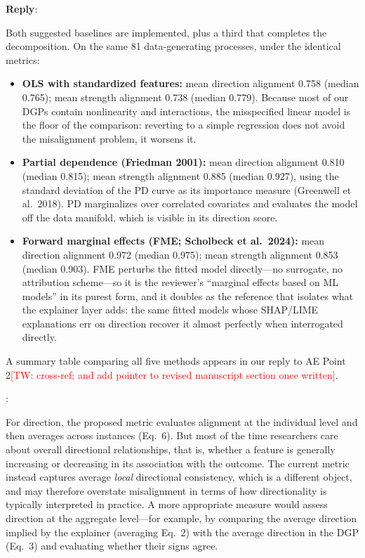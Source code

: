 \documentclass[11pt]{article}
\newcommand{\tw}[1]{\textcolor{red}{[TW: #1]}}
\newcounter{se}[section]
\newcounter{reviewer}
\newcounter{point}[reviewer]
\renewcommand{\thepoint}{R\,\thereviewer.\arabic{point}}
\newenvironment{point}{
    \refstepcounter{point} \bigskip \noindent {\textbf{\thepoint}}: \rmfamily \itshape
}{\medskip}
\newenvironment{reply}
 {\par\medskip \noindent \begin{sf}\textbf{Reply}:\ }
 {\medskip \end{sf}}
\begin{document}
\begin{reply}
{\color{red}
Both suggested baselines are implemented, plus a third that completes the decomposition. On the same 81 data-generating processes, under the identical metrics:

\begin{itemize}[leftmargin=2em]
\item \textbf{OLS with standardized features:} mean direction alignment 0.758 (median 0.765); mean strength alignment 0.738 (median 0.779). Because most of our DGPs contain nonlinearity and interactions, the misspecified linear model is the floor of the comparison: reverting to a simple regression does not avoid the misalignment problem, it worsens it.
\item \textbf{Partial dependence (Friedman 2001):} mean direction alignment 0.810 (median 0.815); mean strength alignment 0.885 (median 0.927), using the standard deviation of the PD curve as its importance measure (Greenwell et al.\ 2018). PD marginalizes over correlated covariates and evaluates the model off the data manifold, which is visible in its direction score.
\item \textbf{Forward marginal effects (FME; Scholbeck et al.\ 2024):} mean direction alignment 0.972 (median 0.975); mean strength alignment 0.853 (median 0.903). FME perturbs the fitted model directly---no surrogate, no attribution scheme---so it is the reviewer's ``marginal effects based on ML models'' in its purest form, and it doubles as the reference that isolates what the explainer layer adds: the same fitted models whose SHAP/LIME explanations err on direction recover it almost perfectly when interrogated directly.
\end{itemize}

A summary table comparing all five methods appears in our reply to AE Point 2\tw{cross-ref; and add pointer to revised manuscript section once written}.
}
\end{reply}


\begin{point}
For direction, the proposed metric evaluates alignment at the individual level and then averages across instances (Eq.~6). But most of the time researchers care about overall directional relationships, that is, whether a feature is generally increasing or decreasing in its association with the outcome. The current metric instead captures average \emph{local} directional consistency, which is a different object, and may therefore overstate misalignment in terms of how directionality is typically interpreted in practice. A more appropriate measure would assess direction at the aggregate level---for example, by comparing the average direction implied by the explainer (averaging Eq.~2) with the average direction in the DGP (Eq.~3) and evaluating whether their signs agree.
\end{point}
\end{document}
